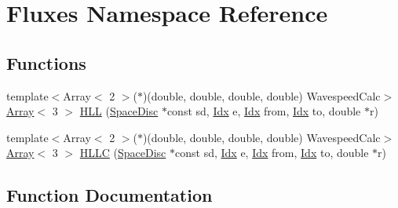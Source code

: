 \hypertarget{namespaceFluxes}{}\section{Fluxes Namespace Reference}
\label{namespaceFluxes}
\subsection*{Functions}
\begin{DoxyCompactItemize}
\item 
{\footnotesize template$<$Array$<$ 2 $>$($\ast$)(double, double, double, double) Wavespeed\+Calc$>$ }\\\hyperlink{Includes_8h_abd9de33944f934950000c3929e14ad8d}{Array}$<$ 3 $>$ \hyperlink{namespaceFluxes_a27c7e7efb42c630f461dd59f715e4687}{H\+LL} (\hyperlink{structSpaceDisc}{Space\+Disc} $\ast$const sd, \hyperlink{Includes_8h_ae78891cd308078a2f5f9e7193065c805}{Idx} e, \hyperlink{Includes_8h_ae78891cd308078a2f5f9e7193065c805}{Idx} from, \hyperlink{Includes_8h_ae78891cd308078a2f5f9e7193065c805}{Idx} to, double $\ast$r)
\item 
{\footnotesize template$<$Array$<$ 2 $>$($\ast$)(double, double, double, double) Wavespeed\+Calc$>$ }\\\hyperlink{Includes_8h_abd9de33944f934950000c3929e14ad8d}{Array}$<$ 3 $>$ \hyperlink{namespaceFluxes_a368a60482d4b0b6248889887ddb71a7a}{H\+L\+LC} (\hyperlink{structSpaceDisc}{Space\+Disc} $\ast$const sd, \hyperlink{Includes_8h_ae78891cd308078a2f5f9e7193065c805}{Idx} e, \hyperlink{Includes_8h_ae78891cd308078a2f5f9e7193065c805}{Idx} from, \hyperlink{Includes_8h_ae78891cd308078a2f5f9e7193065c805}{Idx} to, double $\ast$r)
\end{DoxyCompactItemize}


\subsection{Function Documentation}
\mbox{\label{namespaceFluxes_a27c7e7efb42c630f461dd59f715e4687}} 
